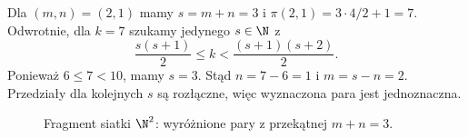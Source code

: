 \begin{przyklad}
\label{ex:card-unpair}
Dla $(m,n)=(2,1)$ mamy $s=m+n=3$ i
$\pi(2,1)=3\cdot4/2+1=7$.
Odwrotnie, dla $k=7$ szukamy jedynego $s\in\N$ z
\[
\frac{s(s+1)}2\le k<\frac{(s+1)(s+2)}2.
\]
Ponieważ $6\le7<10$, mamy $s=3$.
Stąd $n=7-6=1$ i $m=s-n=2$.
Przedziały dla kolejnych $s$ są rozłączne,
więc wyznaczona para jest jednoznaczna.
\end{przyklad}

\begin{figure}[htbp]
\centering
{}
\caption{Fragment siatki $\N^2$: wyróżnione pary
z przekątnej $m+n=3$.}
\label{fig:card-pairing-diagonal}
\end{figure}

